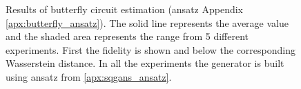 \begin{figure}[htbp!]
  \caption{Results of butterfly circuit estimation (ansatz Appendix \ref{apx:butterfly_ansatz}).
    The solid line represents the average value and the shaded area
    represents the range from 5 different experiments. First the
    fidelity is shown and below the corresponding Wasserstein distance. In all the
    experiments the generator is built using ansatz from \ref{apx:sqgans_ansatz}.}
  \label{fig:wqgans_res_butterfly_3}
\end{figure}
\let\clearpage\oldclearpage

